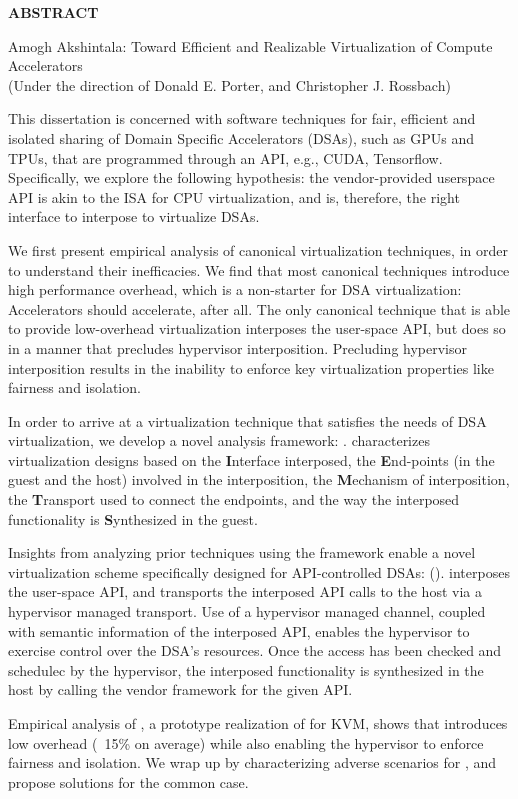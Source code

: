 \begin{center}
\vspace*{52pt}
{\normalfont\textbf{ABSTRACT}}
\vspace{11pt}

\begin{singlespace}
Amogh Akshintala: Toward Efficient and Realizable Virtualization of Compute Accelerators \\
(Under the direction of Donald E. Porter, and Christopher J. Rossbach)
\end{singlespace}
\end{center}

This dissertation is concerned with software techniques for fair, efficient
and isolated sharing of Domain Specific Accelerators (DSAs), such as GPUs and
TPUs, that are programmed through an API, e.g., CUDA, Tensorflow.
Specifically, we explore the following hypothesis: the vendor-provided
userspace API is akin to the ISA for CPU virtualization, and is, therefore, the
right interface to interpose to virtualize DSAs.

We first present empirical analysis of canonical virtualization techniques, in
order to understand their inefficacies. We find that most canonical techniques
introduce high performance overhead, which is a non-starter for DSA
virtualization: Accelerators should accelerate, after all.
The only canonical technique that is able to provide low-overhead
virtualization interposes the user-space API, but does so in a manner that
precludes hypervisor interposition. Precluding hypervisor interposition results
in the inability to enforce key virtualization properties like fairness and
isolation.

In order to arrive at a virtualization technique that satisfies the needs of
DSA virtualization, we develop a novel analysis framework: \iemts. \iemts
characterizes virtualization designs based on the \textbf{I}nterface
interposed, the \textbf{E}nd-points (in the guest and the host) involved in the
interposition, the \textbf{M}echanism of interposition, the \textbf{T}ransport
used to connect the endpoints, and the way the interposed functionality is
\textbf{S}ynthesized in the guest.

Insights from analyzing prior techniques using the \iemts framework enable a novel virtualization scheme specifically designed for API-controlled DSAs: \hirafull (\hira). \hira interposes the user-space API, and transports the
interposed API calls to the host via a hypervisor managed transport. Use of a
hypervisor managed channel, coupled with semantic information of the interposed
API, enables the hypervisor to exercise control over the DSA's resources. Once
the access has been checked and schedulec by the hypervisor, the interposed
functionality is synthesized in the host by calling the vendor framework for
the given API.

Empirical analysis of \AvA, a prototype realization of \hira for KVM, shows
that \hira introduces low overhead (~15\% on average) while also enabling the
hypervisor to enforce fairness and isolation. We wrap up by characterizing
adverse scenarios for \hira, and propose solutions for the common case.

\clearpage